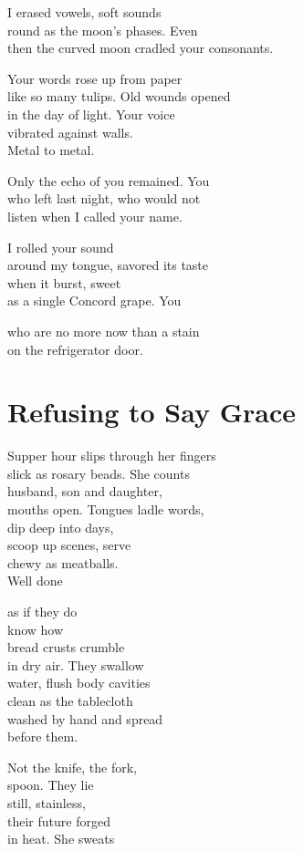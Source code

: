 \documentclass[twoside,10pt]{book}
\begin{document}
I erased vowels, soft sounds\\
round as the moon's phases. Even\\
then the curved moon cradled your consonants.

Your words rose up from paper\\
like so many tulips. Old wounds opened\\
in the day of light. Your voice\\
vibrated against walls.\\
Metal to metal.

Only the echo of you remained. You\\
who left last night, who would not\\
listen when I called your name.

I rolled your sound\\
around my tongue, savored its taste\\
when it burst, sweet\\
as a single Concord grape. You

who are no more now than a stain\\
on the refrigerator door.


\clearpage
\section{Refusing to Say Grace}

Supper hour slips through her fingers\\
slick as rosary beads. She counts\\
husband, son and daughter,\\
mouths open. Tongues ladle words,\\
dip deep into days,\\
scoop up scenes, serve\\
chewy as meatballs.\\
Well done

as if they do\\
know how\\
bread crusts crumble\\
in dry air. They swallow\\
water, flush body cavities\\
clean as the tablecloth\\
washed by hand and spread\\
before them.

Not the knife, the fork,\\
spoon. They lie\\
still, stainless,\\
their future forged\\
in heat. She sweats
\end{document}
